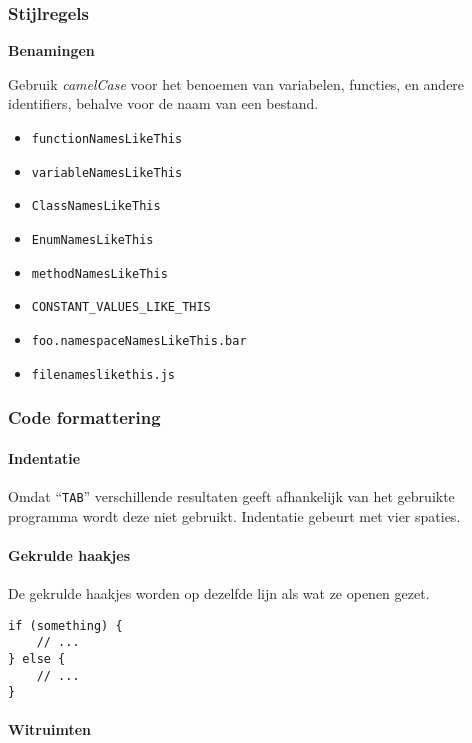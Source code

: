 \subsubsection{Stijlregels}

\textbf{Benamingen}

Gebruik \textit{camelCase} voor het benoemen van variabelen, functies, en andere identifiers, behalve voor de naam van een bestand.

\begin{itemize}
	\item \lstinline{functionNamesLikeThis}
	\item \lstinline{variableNamesLikeThis}
	\item \lstinline{ClassNamesLikeThis}
	\item \lstinline{EnumNamesLikeThis}
	\item \lstinline{methodNamesLikeThis}
	\item \lstinline{CONSTANT_VALUES_LIKE_THIS}
	\item \lstinline{foo.namespaceNamesLikeThis.bar}
	\item \lstinline{filenameslikethis.js}
\end{itemize}

\subsubsection{Code formattering}

\paragraph{Indentatie}

Omdat ``\lstinline{TAB}'' verschillende resultaten geeft afhankelijk van het gebruikte programma wordt deze niet gebruikt. Indentatie gebeurt met vier spaties.

\paragraph{Gekrulde haakjes}

De gekrulde haakjes worden op dezelfde lijn als wat ze openen gezet.\\

\begin{lstlisting}
if (something) {
    // ...
} else {
    // ...
}
\end{lstlisting}

\paragraph{Witruimten}

